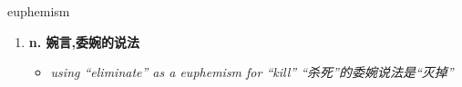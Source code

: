 
\begin{frame}
{\huge euphemism}
\begin{center}
\begin{enumerate}\Large
  \item \textbf{n. 婉言,委婉的说法}
  \begin{itemize}
    \item \em{\Large{using “eliminate” as a euphemism for “kill”  “杀死”的委婉说法是“灭掉”}}
  \end{itemize}
\end{enumerate}
\end{center}
\end{frame}
